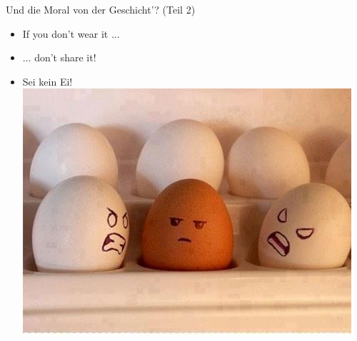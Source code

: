 \begin{frame}
	Und die Moral von der Geschicht'? (Teil 2) \\
	\begin{itemize}
	\item	<1->If you don't wear it ...
	\item <2->... don't share it!
	\item <3-> Sei kein Ei!
			\includegraphics[scale=0.3]{socialmedia-memes/eggs.jpg}
	\end{itemize}
\end{frame}